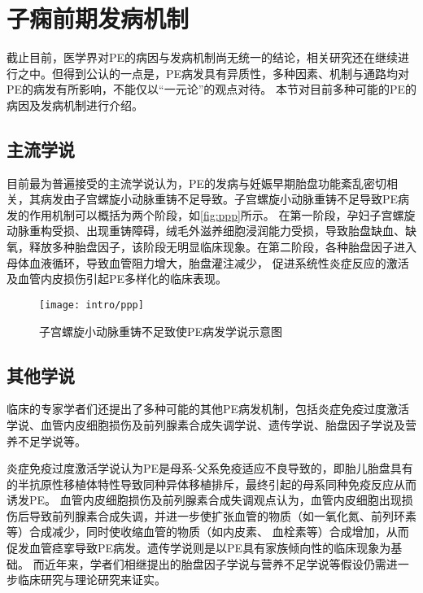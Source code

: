 \section{子痫前期发病机制}
截止目前，医学界对PE的病因与发病机制尚无统一的结论，相关研究还在继续进行之中。但得到公认的一点是，PE病发具有异质性，多种因素、机制与通路均对PE的病发有所影响，不能仅以“一元论”的观点对待。
本节对目前多种可能的PE的病因及发病机制进行介绍。

\subsection{主流学说}
目前最为普遍接受的主流学说认为，PE的发病与妊娠早期胎盘功能紊乱密切相关，其病发由子宫螺旋小动脉重铸不足导致\cite{OAG9,Duvekot2010,Ix2009}。子宫螺旋小动脉重铸不足导致PE病发的作用机制可以概括为两个阶段，如\autoref{fig:ppp}所示。
在第一阶段，孕妇子宫螺旋动脉重构受损、出现重铸障碍，绒毛外滋养细胞浸润能力受损，导致胎盘缺血、缺氧，释放多种胎盘因子，该阶段无明显临床现象。在第二阶段，各种胎盘因子进入母体血液循环，导致血管阻力增大，胎盘灌注减少，
促进系统性炎症反应的激活及血管内皮损伤引起PE多样化的临床表现。
\begin{figure}[htbp]
    \centering
    \texttt{[image: intro/ppp]}
    \caption[子宫螺旋小动脉重铸不足致使PE病发学说示意图]{\label{fig:ppp}子宫螺旋小动脉重铸不足致使PE病发学说示意图\cite{Duvekot2010,Ix2009}}
\end{figure}

\subsection{其他学说}
临床的专家学者们还提出了多种可能的其他PE病发机制，包括炎症免疫过度激活学说、血管内皮细胞损伤及前列腺素合成失调学说、遗传学说、胎盘因子学说及营养不足学说等。

炎症免疫过度激活学说认为PE是母系-父系免疫适应不良导致的，即胎儿胎盘具有的半抗原性移植体特性导致同种异体移植排斥，最终引起的母系同种免疫反应从而诱发PE\cite{Sibai2005,OAG9,Shi2006,Moffett2002}。
血管内皮细胞损伤及前列腺素合成失调观点认为，血管内皮细胞出现损伤后导致前列腺素合成失调，并进一步使扩张血管的物质（如一氧化氮、前列环素等）合成减少，同时使收缩血管的物质（如内皮素、
血栓素等）合成增加，从而促发血管痉挛导致PE病发\cite{OAG9,Sibai2005}。遗传学说则是以PE具有家族倾向性的临床现象为基础\cite{OAG9,Sibai2005,Ge2013}。
而近年来，学者们相继提出的胎盘因子学说\cite{Shi2006}与营养不足学说\cite{OAG9}等假设仍需进一步临床研究与理论研究来证实。
\raggedbottom

